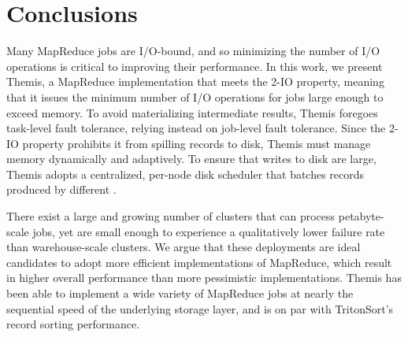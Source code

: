 \section{Conclusions}
\label{themis:sec:conclusions}

Many MapReduce jobs are I/O-bound, and so minimizing the number of I/O
operations is critical to improving their performance.  In this work, we
present Themis, a MapReduce implementation that meets the 2-IO property,
meaning that it issues the minimum number of I/O operations for jobs large
enough to exceed memory.  To avoid materializing intermediate results, Themis
foregoes task-level fault tolerance, relying instead on job-level fault
tolerance. Since the 2-IO property prohibits it from spilling records to disk,
Themis must manage memory dynamically and adaptively. To ensure that writes to
disk are large, Themis adopts a centralized, per-node disk scheduler that
batches records produced by different \mappers.

There exist a large and growing number of clusters that can process
petabyte-scale jobs, yet are small enough to experience a qualitatively lower
failure rate than warehouse-scale clusters.  We argue that these deployments
are ideal candidates to adopt more efficient implementations of MapReduce,
which result in higher overall performance than more pessimistic
implementations.  Themis has been able to implement a wide
variety of MapReduce jobs at nearly the sequential speed of the underlying
storage layer, and is on par with TritonSort's record sorting performance.
